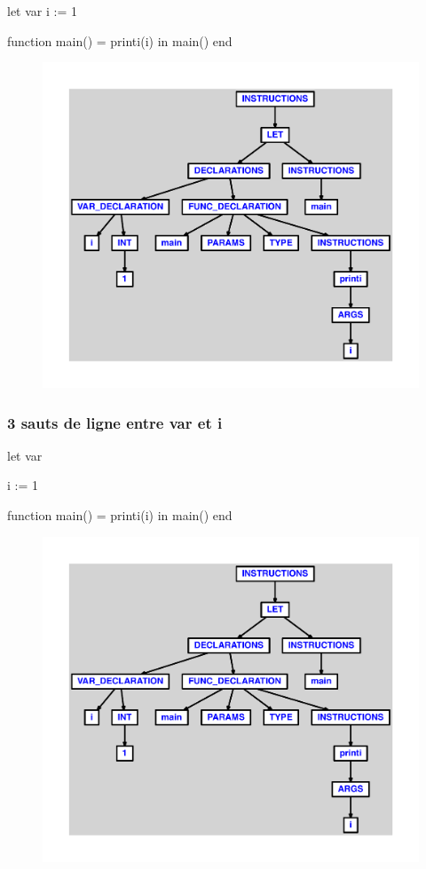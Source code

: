 \documentclass{article}
\begin{document}
\begin{verbatimtab}
let
	var			i := 1

	function main() = printi(i)
in main() end
\end{verbatimtab}
\begin{figure}[H]\centering\includegraphics[max width=\textwidth]{ast/ast_339.pdf}\end{figure}\subsubsection{3 sauts de ligne entre var et i}
\begin{verbatimtab}
let
	var


	i := 1

	function main() = printi(i)
in main() end
\end{verbatimtab}
\begin{figure}[H]\centering\includegraphics[max width=\textwidth]{ast/ast_340.pdf}\end{figure}
\end{document}
